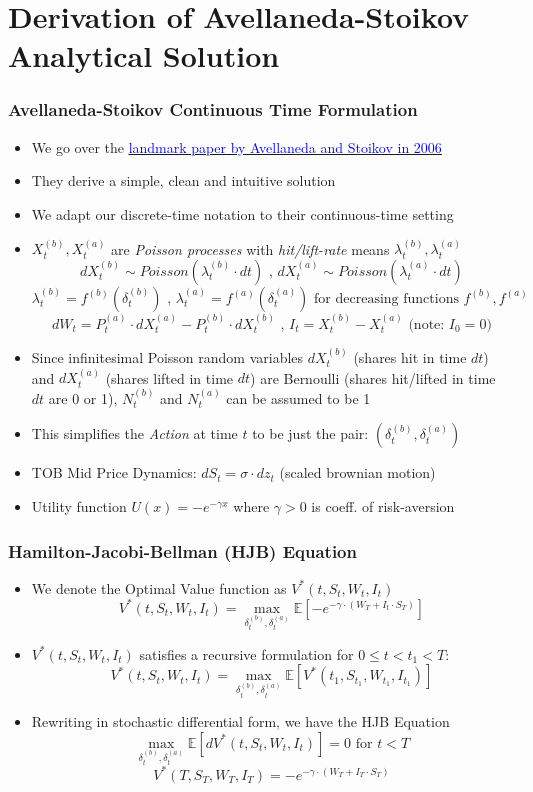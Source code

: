 \documentclass[handout]{beamer}
\begin{document}
\section{Derivation of Avellaneda-Stoikov Analytical Solution}
\begin{frame}
\frametitle{Avellaneda-Stoikov Continuous Time Formulation}
\pause
\begin{itemize}[<+->]
\item We go over the \href{https://www.math.nyu.edu/faculty/avellane/HighFrequencyTrading.pdf}{\underline{\textcolor{blue}{landmark paper by Avellaneda and Stoikov in 2006}}}
\item They derive a simple, clean and intuitive solution
\item We adapt our discrete-time notation to their continuous-time setting
\item $X_t^{(b)}, X_t^{(a)}$ are {\em Poisson processes} with {\em hit/lift-rate} means $\lambda_t^{(b)}, \lambda_t^{(a)}$
$$dX_t^{(b)} \sim Poisson(\lambda_t^{(b)} \cdot dt) \mbox{ , } dX_t^{(a)} \sim Poisson(\lambda_t^{(a)} \cdot dt)$$
$$\lambda_t^{(b)} = f^{(b)}(\delta_t^{(b)}) \mbox{ , } \lambda_t^{(a)} = f^{(a)}(\delta_t^{(a)}) \mbox{ for decreasing functions } f^{(b)}, f^{(a)}$$
$$dW_t = P_t^{(a)} \cdot dX_t^{(a)} - P_t^{(b)} \cdot dX_t^{(b)} \mbox{ , } I_t = X_t^{(b)} - X_t^{(a)} \mbox{ (note: } I_0 = 0 \mbox{)}$$
\item Since infinitesimal Poisson random variables $dX_t^{(b)}$ (shares hit in time $dt$) and $dX_t^{(a)}$ (shares lifted in time $dt$) are Bernoulli (shares hit/lifted in time $dt$ are 0 or 1), $N_t^{(b)}$ and $N_t^{(a)}$ can be assumed to be 1
\item This simplifies the {\em Action} at time $t$ to be just the pair: $(\delta_t^{(b)}, \delta_t^{(a)})$
\item TOB Mid Price Dynamics: $dS_t = \sigma \cdot dz_t$ (scaled brownian motion)
\item Utility function $U(x) = -e^{-\gamma x}$ where $\gamma > 0$ is coeff. of risk-aversion  
\end{itemize}
\end{frame}

\begin{frame}
\frametitle{Hamilton-Jacobi-Bellman (HJB) Equation}
\pause
\begin{itemize}[<+->]
\item We denote the Optimal Value function as $V^*(t, S_t, W_t, I_t)$
$$V^*(t, S_t, W_t, I_t) = \max_{\delta_t^{(b)}, \delta_t^{(a)}} \mathbb{E}[-e^{-\gamma \cdot (W_T + I_t \cdot S_T)}]$$
\item $V^*(t, S_t, W_t, I_t)$ satisfies a recursive formulation for $0 \leq t < t_1 < T$:
$$V^*(t, S_t, W_t, I_t) = \max_{\delta_t^{(b)}, \delta_t^{(a)}} \mathbb{E}[V^*(t_1, S_{t_1}, W_{t_1}, I_{t_1})]$$
\item Rewriting in stochastic differential form, we have the HJB Equation
$$\max_{\delta_t^{(b)}, \delta_t^{(a)}} \mathbb{E}[dV^*(t, S_t, W_t, I_t)] = 0 \mbox{ for } t < T$$
$$V^*(T, S_T, W_T, I_T) = -e^{-\gamma \cdot (W_T + I_T \cdot S_T)}$$
\end{itemize}
\end{frame}
\end{document}

